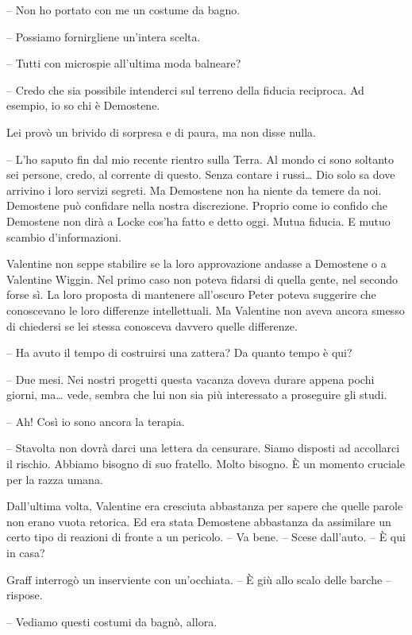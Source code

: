{-- Non ho portato con me un costume da bagno.}

{-- Possiamo fornirgliene un'intera scelta.}

{-- Tutti con microspie all'ultima moda balneare?}

{-- Credo che sia possibile intenderci sul terreno della fiducia
	reciproca. Ad esempio, io so chi è Demostene.}

{Lei provò un brivido di sorpresa e di paura, ma non disse nulla.}

{-- L'ho saputo fin dal mio recente rientro sulla Terra. Al mondo ci
	sono soltanto sei persone, credo, al corrente di questo. Senza contare i
	russi\ldots{} Dio solo sa dove arrivino i loro servizi segreti. Ma
	Demostene non ha niente da temere da noi. Demostene può confidare nella
	nostra discrezione. Proprio come io confido che Demostene non dirà a
	Locke cos'ha fatto e detto oggi. Mutua fiducia. E mutuo scambio
	d'informazioni.}

{Valentine non seppe stabilire se la loro approvazione andasse a
	Demostene o a Valentine Wiggin. Nel primo caso non poteva fidarsi di
	quella gente, nel secondo forse sì. La loro proposta di mantenere
	all'oscuro Peter poteva suggerire che conoscevano le loro differenze
	intellettuali. Ma Valentine non aveva ancora smesso di chiedersi se lei
	stessa conosceva davvero quelle differenze.}

{-- Ha avuto il tempo di costruirsi una zattera? Da quanto tempo è qui?}

{-- Due mesi. Nei nostri progetti questa vacanza doveva durare appena
	pochi giorni, ma\ldots{} vede, sembra che lui non sia più interessato a
	proseguire gli studi.}

{-- Ah! Così io sono ancora la terapia.}

{-- Stavolta non dovrà darci una lettera da censurare. Siamo disposti ad
	accollarci il rischio. Abbiamo bisogno di suo fratello. Molto bisogno. È
	un momento cruciale per la razza umana.}

{Dall'ultima volta, Valentine era cresciuta abbastanza per sapere che
	quelle parole non erano vuota retorica. Ed era stata Demostene
	abbastanza da assimilare un certo tipo di reazioni di fronte a un
	pericolo. -- Va bene. -- Scese dall'auto. -- È qui in casa?}

{Graff interrogò un inserviente con un'occhiata. -- È giù allo scalo
	delle barche -- rispose.}

{-- Vediamo questi costumi da bagnò, allora.}

